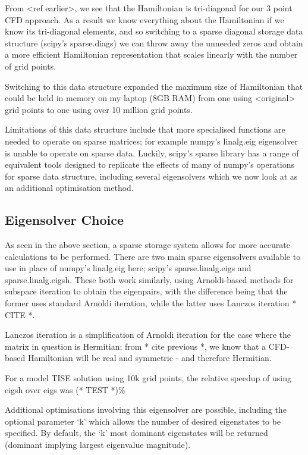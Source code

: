 From <ref earlier>, we see that the Hamiltonian is tri-diagonal for our 3 point CFD approach. As a result we know everything about the Hamiltonian if we know its tri-diagonal elements, and so switching to a sparse diagonal storage data structure (scipy's sparse.diags) we can throw away the unneeded zeros and obtain a more efficient Hamiltonian representation that scales linearly with the number of grid points. 

Switching to this data structure expanded the maximum size of Hamiltonian that could be held in memory on my laptop (8GB RAM) from one using <original> grid points to one using over 10 million grid points.

Limitations of this data structure include that more specialised functions are needed to operate on sparse matrices; for example numpy's linalg.eig eigensolver is unable to operate on sparse data. Luckily, scipy's sparse library has a range of equivalent tools designed to replicate the effects of many of numpy's operations for sparse data structure, including several eigensolvers which we now look at as an additional optimisation method.

\subsection{Eigensolver Choice}
As seen in the above section, a sparse storage system allows for more accurate calculations to be performed. There are two main sparse eigensolvers available to use in place of numpy's linalg.eig here; scipy's sparse.linalg.eigs and sparse.linalg.eigsh. These both work similarly, using Arnoldi-based methods for subspace iteration to obtain the eigenpairs, with the difference being that the former uses standard Arnoldi iteration, while the latter uses Lanczos iteration * CITE *. 

Lanczos iteration is a simplification of Arnoldi iteration for the case where the matrix in question is Hermitian; from * cite previous *, we know that a CFD-based Hamiltonian will be real and symmetric - and therefore Hermitian. 

For a model TISE solution using 10k grid points, the relative speedup of using eigsh over eigs was (* TEST *)\%

Additional optimisations involving this eigensolver are possible, including the optional parameter `k' which allows the number of desired eigenstates to be specified. By default, the `k' most dominant eigenstates will be returned (dominant implying largest eigenvalue magnitude). 

